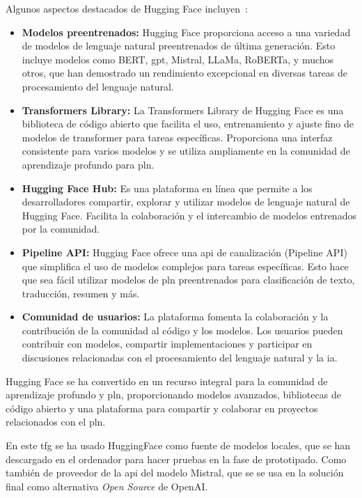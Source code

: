Algunos aspectos destacados de Hugging Face incluyen~\cite{HuggingFace}:
\begin{itemize}

\item \textbf{Modelos preentrenados:} Hugging Face proporciona acceso a una variedad de modelos de lenguaje natural preentrenados de última generación. Esto incluye modelos como BERT, \acrshort{gpt}, Mistral, LLaMa, RoBERTa, y muchos otros, que han demostrado un rendimiento excepcional en diversas tareas de procesamiento del lenguaje natural.

\item \textbf{Transformers Library:} La Transformers Library de Hugging Face es una biblioteca de código abierto que facilita el uso, entrenamiento y ajuste fino de modelos de transformer para tareas específicas. Proporciona una interfaz consistente para varios modelos y se utiliza ampliamente en la comunidad de aprendizaje profundo para \acrshort{pln}.

\item \textbf{Hugging Face Hub:} Es una plataforma en línea que permite a los desarrolladores compartir, explorar y utilizar modelos de lenguaje natural de Hugging Face. Facilita la colaboración y el intercambio de modelos entrenados por la comunidad.

\item \textbf{Pipeline API:} Hugging Face ofrece una \acrshort{api} de canalización (Pipeline API) que simplifica el uso de modelos complejos para tareas específicas. Esto hace que sea fácil utilizar modelos de \acrshort{pln} preentrenados para clasificación de texto, traducción, resumen y más.

\item \textbf{Comunidad de usuarios:} La plataforma fomenta la colaboración y la contribución de la comunidad al código y los modelos. Los usuarios pueden contribuir con modelos, compartir implementaciones y participar en discusiones relacionadas con el procesamiento del lenguaje natural y la \acrlong{ia}.
\end{itemize}

Hugging Face se ha convertido en un recurso integral para la comunidad de aprendizaje profundo y \acrshort{pln}, proporcionando modelos avanzados, bibliotecas de código abierto y una plataforma para compartir y colaborar en proyectos relacionados con el \acrlong{pln}.

En este \acrshort{tfg} se ha usado HuggingFace como fuente de modelos locales, que se han descargado en el ordenador para hacer pruebas en la fase de prototipado. Como también de proveedor de la \acrshort{api} del modelo Mistral, que se se usa en la solución final como alternativa \textit{Open Source} de OpenAI.

